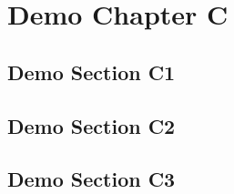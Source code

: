 

\chapter{Demo Chapter C}
\label{ch:ch4}
\lipsum[40-41]


\section{Demo Section C1}
\lipsum[42-42]


\section{Demo Section C2}
\lipsum[44-45]


\section{Demo Section C3}
\lipsum[46-47]
